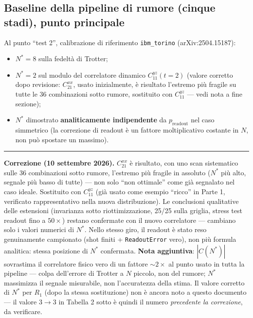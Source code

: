 \documentclass[11pt,a4paper]{article}
\begin{document}

\subsection{Baseline della pipeline di rumore (cinque stadi), punto principale}

Al punto ``test 2'', calibrazione di riferimento \texttt{ibm\_torino}
(arXiv:2504.15187):
\begin{itemize}[nosep]
  \item $N^*=8$ sulla fedeltà di Trotter;
  \item $N^*=2$ sul modulo del correlatore dinamico $C_{11}^{yz}(t=2)$
  (valore corretto dopo revisione: $C_{21}^{xx}$, usato inizialmente, è
  risultato l'estremo più fragile su tutte le 36 combinazioni sotto
  rumore, sostituito con $C_{11}^{yz}$ --- vedi nota a fine sezione);
  \item $N^*$ dimostrato \textbf{analiticamente indipendente} da
  $p_\text{readout}$ nel caso simmetrico (la correzione di readout è un
  fattore moltiplicativo costante in $N$, non può spostare un massimo).
\end{itemize}

\begin{center}
\begin{minipage}{0.93\textwidth}
\small\textcolor{rossos}{\rule{2.2em}{1.1pt}}\enspace
\textcolor{rossos}{\textbf{Correzione (10 settembre 2026).}}\enspace
$C_{21}^{xx}$ è risultato, con uno scan sistematico sulle 36 combinazioni
sotto rumore, l'estremo più fragile in assoluto ($N^*$ più alto, segnale
più basso di tutte) --- non solo ``non ottimale'' come già segnalato nel
caso ideale. Sostituito con $C_{11}^{yz}$ (già usato come esempio ``ricco''
in Parte 1, verificato rappresentativo nella nuova distribuzione). Le
conclusioni qualitative delle estensioni (invarianza sotto riottimizzazione,
25/25 sulla griglia, stress test readout fino a $50\times$) restano confermate
con il nuovo correlatore --- cambiano solo i valori numerici di $N^*$. Nello
stesso giro, il readout è stato reso genuinamente campionato (shot finiti +
\texttt{ReadoutError} vero), non più formula analitica: stessa posizione di
$N^*$ confermata. \textbf{Nota aggiuntiva}: $|C(N^*)|$ sovrastima il
correlatore fisico vero di un fattore $\sim2\times$ al punto usato in tutta
la pipeline --- colpa dell'errore di Trotter a $N$ piccolo, non del rumore;
$N^*$ massimizza il segnale misurabile, non l'accuratezza della stima. Il
valore corretto di $N^*$ per $R_1$ (dopo la stessa sostituzione) non è
ancora noto a questo documento --- il valore $3\to3$ in Tabella 2 sotto è
quindi il numero \emph{precedente la correzione}, da verificare.
\end{minipage}
\end{center}
\medskip
\end{document}
